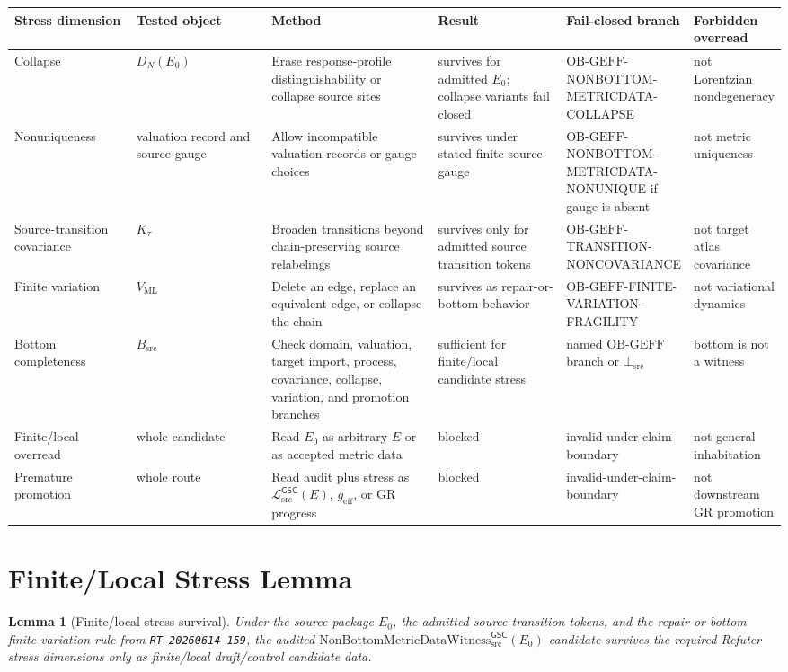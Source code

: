 \documentclass[11pt]{article}
\newcommand{\Witness}{\mathrm{NonBottomMetricDataWitness}_{\mathrm{src}}^{\mathsf{GSC}}}
\newcommand{\MetricData}{\mathcal{L}_{\mathrm{src}}^{\mathsf{GSC}}}
\newcommand{\BottomSrc}{\bot_{\mathrm{src}}}
\newcommand{\OBGEFF}{\mathrm{OB\mbox{-}GEFF}}
\newcommand{\geff}{g_{\mathrm{eff}}}
\newcommand{\Ezero}{E_{0}}
\newtheorem{lemma}{Lemma}
\begin{document}
\begin{longtable}{p{0.16\linewidth}p{0.18\linewidth}p{0.22\linewidth}p{0.17\linewidth}p{0.15\linewidth}p{0.12\linewidth}}
\toprule
Stress dimension & Tested object & Method & Result & Fail-closed branch & Forbidden overread \\
\midrule
Collapse &
\(D_N(\Ezero)\) &
Erase response-profile distinguishability or collapse source sites &
survives for admitted \(E_0\); collapse variants fail closed &
\(\OBGEFF\)-NONBOTTOM-METRICDATA-COLLAPSE &
not Lorentzian nondegeneracy \\
Nonuniqueness &
valuation record and source gauge &
Allow incompatible valuation records or gauge choices &
survives under stated finite source gauge &
\(\OBGEFF\)-NONBOTTOM-METRICDATA-NONUNIQUE if gauge is absent &
not metric uniqueness \\
Source-transition covariance &
\(K_{\tau}\) &
Broaden transitions beyond chain-preserving source relabelings &
survives only for admitted source transition tokens &
\(\OBGEFF\)-TRANSITION-NONCOVARIANCE &
not target atlas covariance \\
Finite variation &
\(V_{\mathrm{ML}}\) &
Delete an edge, replace an equivalent edge, or collapse the chain &
survives as repair-or-bottom behavior &
\(\OBGEFF\)-FINITE-VARIATION-FRAGILITY &
not variational dynamics \\
Bottom completeness &
\(B_{\mathrm{src}}\) &
Check domain, valuation, target import, process, covariance, collapse,
variation, and promotion branches &
sufficient for finite/local candidate stress &
named \(\OBGEFF\) branch or \(\BottomSrc\) &
bottom is not a witness \\
Finite/local overread &
whole candidate &
Read \(E_0\) as arbitrary \(E\) or as accepted metric data &
blocked &
invalid-under-claim-boundary &
not general inhabitation \\
Premature promotion &
whole route &
Read audit plus stress as \(\MetricData(E)\), \(\geff\), or GR progress &
blocked &
invalid-under-claim-boundary &
not downstream GR promotion \\
\bottomrule
\end{longtable}

\section{Finite/Local Stress Lemma}

\begin{lemma}[Finite/local stress survival]
Under the source package \(\Ezero\), the admitted source transition tokens,
and the repair-or-bottom finite-variation rule from \texttt{RT-20260614-159},
the audited \(\Witness(\Ezero)\) candidate survives the required Refuter
stress dimensions only as finite/local draft/control candidate data.
\end{lemma}
\end{document}
